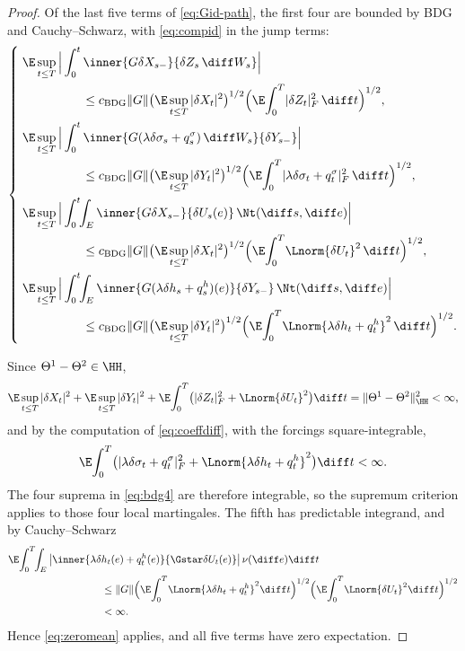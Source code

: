 \begin{proof}
Of the last five terms of \eqref{eq:Gid-path}, the first four are bounded by BDG and
Cauchy--Schwarz, with \eqref{eq:compid} in the jump terms:
\begin{equation}\label{eq:bdg4}
\left\{\;
\begin{aligned}
&\E\sup_{t\le T}\Big|\int_0^t\inner{G\delta X_{s-}}{\delta Z_s\,\diff W_s}\Big|\\
&\hspace{0.14\linewidth}\le c_{\mathrm{BDG}}\|G\|\big(\E\sup_{t\le T}|\delta X_t|^2\big)^{1/2}
\Big(\E\!\int_0^T\!|\delta Z_t|_F^2\,\diff t\Big)^{1/2},\\
&\E\sup_{t\le T}\Big|\int_0^t\inner{G(\lambda\delta\sigma_s+q^\sigma_s)\,\diff W_s}{\delta Y_{s-}}\Big|\\
&\hspace{0.14\linewidth}\le c_{\mathrm{BDG}}\|G\|\big(\E\sup_{t\le T}|\delta Y_t|^2\big)^{1/2}
\Big(\E\!\int_0^T\!|\lambda\delta\sigma_t+q^\sigma_t|_F^2\,\diff t\Big)^{1/2},\\
&\E\sup_{t\le T}\Big|\int_0^t\!\!\int_E\inner{G\delta X_{s-}}{\delta U_s(e)}\,\Nt(\diff s,\diff e)\Big|\\
&\hspace{0.14\linewidth}\le c_{\mathrm{BDG}}\|G\|\big(\E\sup_{t\le T}|\delta X_t|^2\big)^{1/2}
\Big(\E\!\int_0^T\!\Lnorm{\delta U_t}^2\,\diff t\Big)^{1/2},\\
&\E\sup_{t\le T}\Big|\int_0^t\!\!\int_E\inner{G(\lambda\delta h_s+q^h_s)(e)}{\delta Y_{s-}}\,\Nt(\diff s,\diff e)\Big|\\
&\hspace{0.14\linewidth}\le c_{\mathrm{BDG}}\|G\|\big(\E\sup_{t\le T}|\delta Y_t|^2\big)^{1/2}
\Big(\E\!\int_0^T\!\Lnorm{\lambda\delta h_t+q^h_t}^2\,\diff t\Big)^{1/2} .
\end{aligned}
\right.
\end{equation}

Since $\Theta^1-\Theta^2\in\HH$,
\[
\E\sup_{t\le T}|\delta X_t|^2+\E\sup_{t\le T}|\delta Y_t|^2
+\E\!\int_0^T\!\big(|\delta Z_t|_F^2+\Lnorm{\delta U_t}^2\big)\diff t
=\|\Theta^1-\Theta^2\|_{\HH}^2<\infty ,
\]
and by the computation of \eqref{eq:coeffdiff}, with the forcings square-integrable,
\[
\E\!\int_0^T\!\big(|\lambda\delta\sigma_t+q^\sigma_t|_F^2
+\Lnorm{\lambda\delta h_t+q^h_t}^2\big)\diff t<\infty .
\]
The four suprema in \eqref{eq:bdg4} are therefore integrable, so the supremum criterion
applies to those four local martingales. The fifth has predictable
integrand, and by Cauchy--Schwarz
\[
\begin{aligned}
&\E\!\int_0^T\!\!\int_E\big|\inner{\lambda\delta h_t(e)+q^h_t(e)}{\Gstar\delta U_t(e)}\big|\,\nu(\diff e)\diff t\\
&\hspace{0.26\linewidth}\le\|G\|\Big(\E\!\int_0^T\!\Lnorm{\lambda\delta h_t+q^h_t}^2\diff t\Big)^{1/2}
\Big(\E\!\int_0^T\!\Lnorm{\delta U_t}^2\diff t\Big)^{1/2}\\
&\hspace{0.26\linewidth}<\infty .
\end{aligned}
\]
Hence \eqref{eq:zeromean} applies, and all five terms have zero expectation.


\end{proof}
